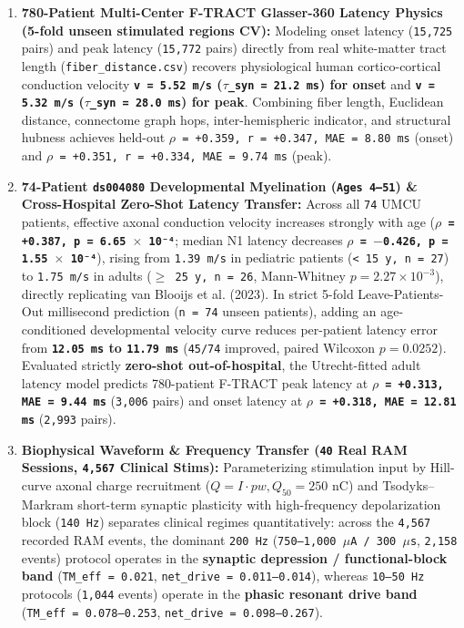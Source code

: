 \documentclass[11pt,a4paper]{article}
\begin{document}
\begin{enumerate}
\item \textbf{780-Patient Multi-Center F-TRACT Glasser-360 Latency Physics (5-fold unseen stimulated regions CV):} Modeling onset latency (\texttt{15,725} pairs) and peak latency (\texttt{15,772} pairs) directly from real white-matter tract length (\texttt{fiber\_distance.csv}) recovers physiological human cortico-cortical conduction velocity \textbf{\texttt{v = 5.52 m/s} (\texttt{$\tau$\_syn = 21.2 ms}) for onset} and \textbf{\texttt{v = 5.32 m/s} (\texttt{$\tau$\_syn = 28.0 ms}) for peak}. Combining fiber length, Euclidean distance, connectome graph hops, inter-hemispheric indicator, and structural hubness achieves held-out \texttt{$\rho$ = +0.359, r = +0.347, MAE = 8.80 ms} (onset) and \texttt{$\rho$ = +0.351, r = +0.334, MAE = 9.74 ms} (peak).
\item \textbf{74-Patient \texttt{ds004080} Developmental Myelination (\texttt{Ages 4--51}) \& Cross-Hospital Zero-Shot Latency Transfer:} Across all \texttt{74} UMCU patients, effective axonal conduction velocity increases strongly with age (\textbf{\texttt{$\rho$ = +0.387, p = 6.65 $\times$ 10⁻⁴}}; median N1 latency decreases \textbf{\texttt{$\rho$ = $-$0.426, p = 1.55 $\times$ 10⁻⁴}}), rising from \texttt{1.39 m/s} in pediatric patients (\texttt{< 15 y, n = 27}) to \texttt{1.75 m/s} in adults (\texttt{$\ge$ 25 y, n = 26}, Mann-Whitney $p = 2.27 \times 10^{-3}$), directly replicating van Blooijs et al. (2023). In strict 5-fold Leave-Patients-Out millisecond prediction (\texttt{n = 74} unseen patients), adding an age-conditioned developmental velocity curve reduces per-patient latency error from \textbf{\texttt{12.05 ms} to \texttt{11.79 ms}} (\texttt{45/74} improved, paired Wilcoxon $p = 0.0252$). Evaluated strictly \textbf{zero-shot out-of-hospital}, the Utrecht-fitted adult latency model predicts 780-patient F-TRACT peak latency at \textbf{\texttt{$\rho$ = +0.313, MAE = 9.44 ms}} (\texttt{3,006} pairs) and onset latency at \textbf{\texttt{$\rho$ = +0.318, MAE = 12.81 ms}} (\texttt{2,993} pairs).
\item \textbf{Biophysical Waveform \& Frequency Transfer (\texttt{40} Real RAM Sessions, \texttt{4,567} Clinical Stims):} Parameterizing stimulation input by Hill-curve axonal charge recruitment ($Q = I \cdot pw, Q_{50} = 250\text{ nC}$) and Tsodyks--Markram short-term synaptic plasticity with high-frequency depolarization block (\texttt{140 Hz}) separates clinical regimes quantitatively: across the \texttt{4,567} recorded RAM events, the dominant \texttt{200 Hz} (\texttt{750--1,000 $\mu$A / 300 $\mu$s}, \texttt{2,158} events) protocol operates in the \textbf{synaptic depression / functional-block band} (\texttt{TM\_eff = 0.021}, \texttt{net\_drive = 0.011--0.014}), whereas \texttt{10--50 Hz} protocols (\texttt{1,044} events) operate in the \textbf{phasic resonant drive band} (\texttt{TM\_eff = 0.078--0.253}, \texttt{net\_drive = 0.098--0.267}).
\end{enumerate}
\end{document}
